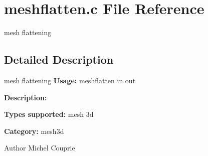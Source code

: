 \section{meshflatten.c File Reference}
\label{meshflatten_8c}


mesh flattening  




\subsection{Detailed Description}
mesh flattening {\bfseries Usage:} meshflatten in out

{\bfseries Description:}

{\bfseries Types supported:} mesh 3d

{\bfseries Category:} mesh3d

\begin{DoxyAuthor}{Author}
Michel Couprie 
\end{DoxyAuthor}
